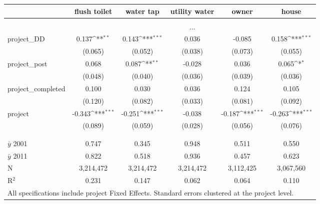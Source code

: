 {\footnotesize
{}  
\def\sym#1{\ifmmode^{#1}\else\(^{#1}\)\fi}
\begin{tabular}{l*{5}{c}}
          &\multicolumn{1}{c}{flush toilet}         &\multicolumn{1}{c}{water tap}         &\multicolumn{1}{c}{utility water}         &\multicolumn{1}{c}{owner}         &\multicolumn{1}{c}{house}         \\[0.2em]
\hline\\[-0.9em]
& \multicolumn{5}{c}{...}\\
[.5em]
\rowcolor{o} project\_DD  &  0.137\sym{**} &  0.143\sym{***}&   0.036       &   -0.085         &    0.158\sym{***}\\
\rowcolor{o} &  (0.065)       &  (0.052)       &  (0.038)      &  (0.073)         &  (0.055)         \\
[.5em]
project\_post&    0.068     &   0.087\sym{**} &   -0.028      &    0.036         &    0.065\sym{*}  \\
            &  (0.048)     &  (0.040)        &  (0.036)      &  (0.039)         &  (0.036)         \\
[.5em]
project\_completed& 0.100   &    0.030        &    0.036      &    0.124         &    0.105         \\
                 &(0.120)  &  (0.082)        &  (0.033)      &  (0.081)         &  (0.092)         \\
[.5em]
project    &-0.343\sym{***}& -0.251\sym{***} &  -0.038       & -0.187\sym{***}  &   -0.263\sym{***}\\
           &  (0.089)      &  (0.059)        &  (0.028)      &  (0.056)         &  (0.076)         \\
          \\[-0.9em]
\hline \\[-0.9em] 
$\bar{y}$ 2001& 0.747      &    0.345        &    0.948      &    0.511         &    0.550         \\
$\bar{y}$ 2011& 0.822      &    0.518        &    0.936      &    0.457         &    0.623         \\
N          &  3,214,472    &  3,214,472      &  3,214,472    &  3,112,425       &  3,067,560       \\
R$^{2}$    &    0.231      &    0.147        &    0.062      &    0.064         &    0.110         \\
\hline
\multicolumn{6}{l}{\tiny All specifications include project Fixed Effects. Standard errors clustered at the project level.}
\end{tabular}
}

